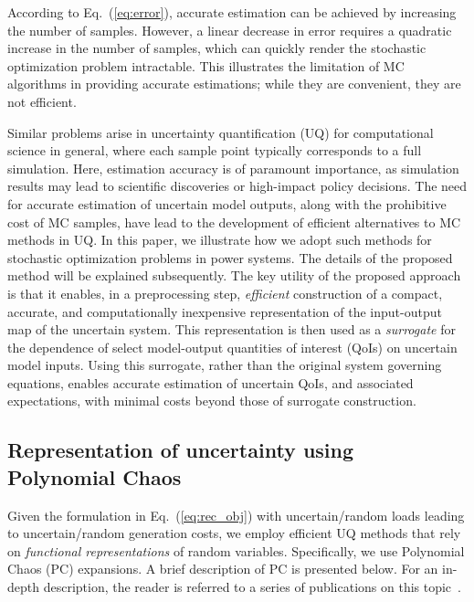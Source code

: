 \documentclass[conference]{IEEEtran}
\begin{document}
According to Eq.~(\ref{eq:error}), accurate estimation can be achieved by increasing the 
number of samples. However, a linear decrease in error requires a quadratic increase
in the number of samples, which can quickly render the stochastic optimization
problem intractable. This illustrates the limitation of MC
algorithms in providing accurate estimations; while they are convenient, they are
not efficient. 

Similar problems arise in uncertainty quantification (UQ) for computational
science in general, where each sample point typically corresponds to a full
simulation.  Here, estimation accuracy is of paramount
importance, as simulation results may lead to scientific discoveries  or
high-impact policy decisions. The need for accurate estimation of uncertain
model outputs, along with the prohibitive cost of MC samples, have lead to the
development of efficient alternatives to MC methods in UQ. In this paper, we
illustrate how we adopt such methods for stochastic optimization problems
in power systems.  The details of the proposed method will be explained 
subsequently. The key utility of the proposed approach is that it enables, in a
preprocessing step, \emph{efficient} construction of a compact, accurate, and
computationally inexpensive representation of the input-output map of the
uncertain system. This representation is then used as a \emph{surrogate} for
the dependence of select model-output quantities of interest (QoIs) on uncertain
model inputs. Using this surrogate, rather than the original system governing
equations, enables accurate estimation of uncertain QoIs, and associated
expectations, with minimal costs beyond those of surrogate construction.

\subsection{Representation of uncertainty using Polynomial Chaos} 

Given the formulation in Eq.~(\ref{eq:rec_obj}) with uncertain/random loads
leading to uncertain/random generation costs, we employ efficient UQ methods
that rely on \emph{functional representations} of random variables.  Specifically,
we use Polynomial Chaos (PC) expansions. A brief description of PC is presented
below. For an in-depth description, the reader is referred to a series of
publications on this topic~\cite{Wiener:1938,Ghanem:1991,Janson:1997,Xiu:2002c}.
\end{document}

